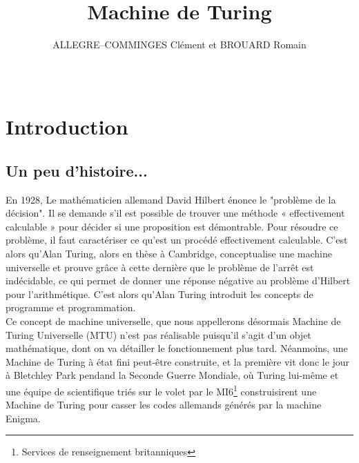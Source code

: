 \documentclass[12pt]{article}
\title{Machine de Turing}
\author{ALLEGRE--COMMINGES Clément et BROUARD Romain}
\date{~}
\begin{document}
	\maketitle
	\tableofcontents
	\section{Introduction}
	\subsection{Un peu d'histoire...}
	En 1928, Le mathématicien allemand David Hilbert énonce le "problème de la décision". Il se demande s'il est possible de trouver une méthode « effectivement calculable » pour décider si une proposition est démontrable. Pour résoudre ce problème, il faut caractériser ce qu'est un procédé effectivement calculable. C'est alors qu'Alan Turing, alors en thèse à Cambridge, conceptualise une machine universelle et prouve grâce à cette dernière que le problème de l'arrêt est indécidable, ce qui permet de donner une réponse négative au problème d'Hilbert pour l'arithmétique. C'est alors qu'Alan Turing introduit les concepts de programme et programmation.\\
	Ce concept de machine universelle, que nous appellerons désormais Machine de Turing Universelle (MTU) n'est pas réalisable puisqu'il s'agit d'un objet mathématique, dont on va détailler le fonctionnement plus tard. Néanmoins, une Machine de Turing à état fini peut-être construite, et la première vit donc le jour à Bletchley Park pendand la Seconde Guerre Mondiale, où Turing lui-même et une équipe de scientifique triés sur le volet par le MI6\footnote{Services de renseignement britanniques} construisirent une Machine de Turing pour casser les codes allemands générés par la machine Enigma.\\
	
\end{document}
